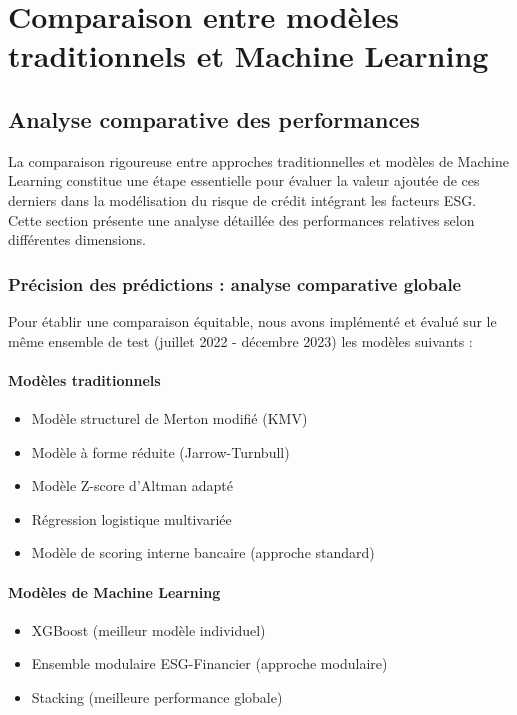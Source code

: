 \chapter{Comparaison entre modèles traditionnels et Machine Learning}

\section{Analyse comparative des performances}

La comparaison rigoureuse entre approches traditionnelles et modèles de Machine Learning constitue une étape essentielle pour évaluer la valeur ajoutée de ces derniers dans la modélisation du risque de crédit intégrant les facteurs ESG. Cette section présente une analyse détaillée des performances relatives selon différentes dimensions.

\subsection{Précision des prédictions : analyse comparative globale}

Pour établir une comparaison équitable, nous avons implémenté et évalué sur le même ensemble de test (juillet 2022 - décembre 2023) les modèles suivants :

\subsubsection{Modèles traditionnels}
\begin{itemize}
  \item Modèle structurel de Merton modifié (KMV)
  \item Modèle à forme réduite (Jarrow-Turnbull)
  \item Modèle Z-score d'Altman adapté
  \item Régression logistique multivariée
  \item Modèle de scoring interne bancaire (approche standard)
\end{itemize}

\subsubsection{Modèles de Machine Learning}
\begin{itemize}
  \item XGBoost (meilleur modèle individuel)
  \item Ensemble modulaire ESG-Financier (approche modulaire)
  \item Stacking (meilleure performance globale)
\end{itemize}

